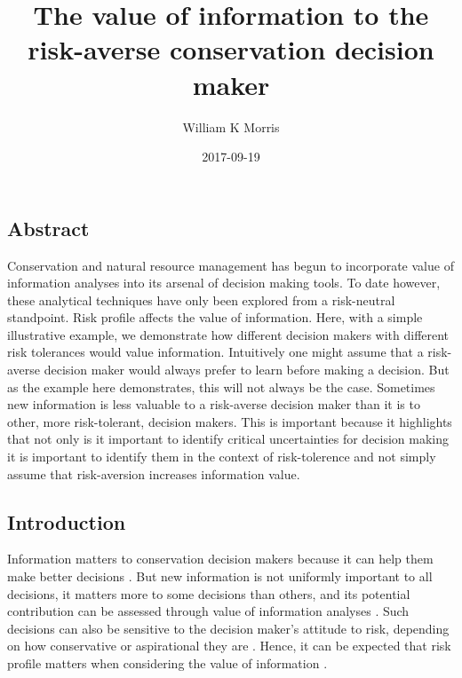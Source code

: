 \documentclass[]{article}
\title{The value of information to the risk-averse conservation decision maker}
\author{William K Morris}
\date{2017-09-19}
\theoremstyle{definition}
\theoremstyle{definition}
\theoremstyle{definition}
\theoremstyle{remark}
\begin{document}
\maketitle


\subsection*{Abstract}\label{abstract}

Conservation and natural resource management has begun to incorporate value of information analyses into its arsenal of decision making tools. To date however, these analytical techniques have only been explored from a risk-neutral standpoint. Risk profile affects the value of information. Here, with a simple illustrative example, we demonstrate how different decision makers with different risk tolerances would value information. Intuitively one might assume that a risk-averse decision maker would always prefer to learn before making a decision. But as the example here demonstrates, this will not always be the case. Sometimes new information is less valuable to a risk-averse decision maker than it is to other, more risk-tolerant, decision makers. This is important because it highlights that not only is it important to identify critical uncertainties for decision making it is important to identify them in the context of risk-tolerence and not simply assume that risk-aversion increases information value.

\subsection*{Introduction}\label{introduction}

Information matters to conservation decision makers because it can help
them make better decisions \citep{Canessa2015}. But new information is
not uniformly important to all decisions, it matters more to some
decisions than others, and its potential contribution can be assessed
through value of information analyses \citep{Yokota2004b}. Such
decisions can also be sensitive to the decision maker's attitude to
risk, depending on how conservative or aspirational they are
\citep{Burgman2005}. Hence, it can be expected that risk profile matters
when considering the value of information \citep{Eeckhoudt2000}.
\end{document}
